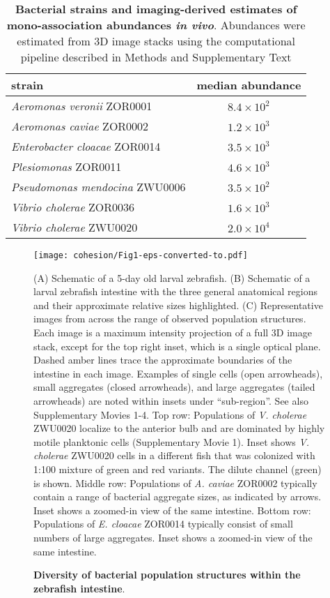 \begin{table}
\centering
\begin{tabular}{l c }
\midrule
 strain               & median abundance     \\
\midrule
\textit{Aeromonas veronii} ZOR0001 &    $8.4 \times 10^2$                \\
\textit{Aeromonas caviae} ZOR0002 &   $1.2 \times 10^3$                  \\
\textit{Enterobacter cloacae} ZOR0014   &   $ 3.5 \times 10^3$            \\
\textit{Plesiomonas} ZOR0011      &  $ 4.6 \times 10^3 $      \\
\textit{Pseudomonas mendocina} ZWU0006         &   $3.5 \times 10^2$               \\
\textit{Vibrio cholerae} ZOR0036       &    $1.6 \times 10^3$                 \\
\textit{Vibrio cholerae} ZWU0020       &    $2.0 \times 10^4$                 \\
\midrule        
\end{tabular}\caption{\textbf{Bacterial strains and imaging-derived estimates of mono-association abundances \textit{in vivo}}.  Abundances were estimated from 3D image stacks using the computational pipeline described in Methods and Supplementary Text}
\end{table}

\begin{figure}%
	\centerline{
		\texttt{[image: cohesion/Fig1-eps-converted-to.pdf]}}
	\caption{\textbf{Diversity of bacterial population structures within the zebrafish intestine}.}{(A) Schematic of a 5-day old larval zebrafish. (B) Schematic of a larval zebrafish intestine with the three general anatomical regions and their approximate relative sizes highlighted. (C) Representative images from across the range of observed population structures. Each image is a maximum intensity projection of a full 3D image stack, except for the top right inset, which is a single optical plane. Dashed amber lines trace the approximate boundaries of the intestine in each image. Examples of single cells (open arrowheads), small aggregates (closed arrowheads), and large aggregates (tailed arrowheads) are noted within insets under ``sub-region''. See also Supplementary Movies 1-4.  Top row: Populations of \textit{V. cholerae} ZWU0020 localize to the anterior bulb and are dominated by highly motile planktonic cells (Supplementary Movie 1). Inset shows \textit{V. cholerae} ZWU0020 cells in a different fish that was colonized with 1:100 mixture of green and red variants. The dilute channel (green) is shown. Middle row: Populations of \textit{A. caviae} ZOR0002 typically contain a range of bacterial aggregate sizes, as indicated by arrows. Inset shows a zoomed-in view of the same intestine. Bottom row: Populations of \textit{E. cloacae} ZOR0014 typically consist of small numbers of large aggregates. Inset shows a zoomed-in view of the same intestine.}
\end{figure}

